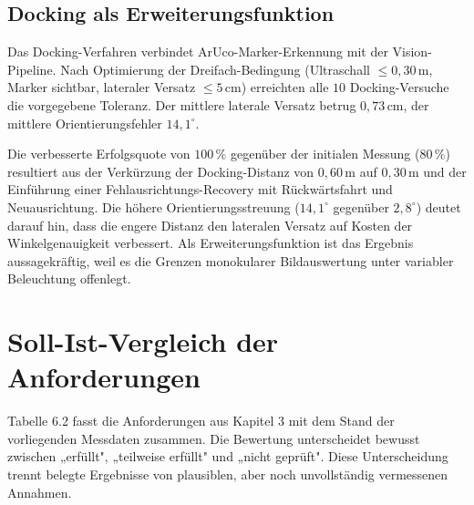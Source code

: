 \subsection{Docking als Erweiterungsfunktion}

Das Docking-Verfahren verbindet ArUco-Marker-Erkennung mit der Vision-Pipeline. Nach Optimierung der Dreifach-Bedingung (Ultraschall $\leq 0{,}30\,\mathrm{m}$, Marker sichtbar, lateraler Versatz $\leq 5\,\mathrm{cm}$) erreichten alle $10$ Docking-Versuche die vorgegebene Toleranz. Der mittlere laterale Versatz betrug $0{,}73\,\mathrm{cm}$, der mittlere Orientierungsfehler $14{,}1^\circ$.

Die verbesserte Erfolgsquote von $100\,\%$ gegenüber der initialen Messung ($80\,\%$) resultiert aus der Verkürzung der Docking-Distanz von $0{,}60\,\mathrm{m}$ auf $0{,}30\,\mathrm{m}$ und der Einführung einer Fehlausrichtungs-Recovery mit Rückwärtsfahrt und Neuausrichtung. Die höhere Orientierungsstreuung ($14{,}1^\circ$ gegenüber $2{,}8^\circ$) deutet darauf hin, dass die engere Distanz den lateralen Versatz auf Kosten der Winkelgenauigkeit verbessert. Als Erweiterungsfunktion ist das Ergebnis aussagekräftig, weil es die Grenzen monokularer Bildauswertung unter variabler Beleuchtung offenlegt.

\section{Soll-Ist-Vergleich der Anforderungen}

Tabelle 6.2 fasst die Anforderungen aus Kapitel 3 mit dem Stand der vorliegenden Messdaten zusammen. Die Bewertung unterscheidet bewusst zwischen „erfüllt", „teilweise erfüllt" und „nicht geprüft". Diese Unterscheidung trennt belegte Ergebnisse von plausiblen, aber noch unvollständig vermessenen Annahmen.

